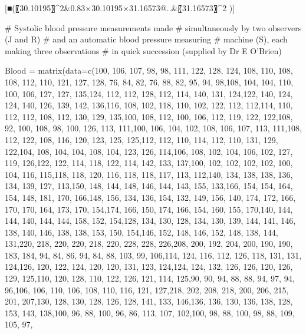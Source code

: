 [■(〖30.10195〗^2&0.83×30.10195×31.16573@..&〖31.16573〗^2 )]



# Systolic blood pressure measurements made 
# simultaneously by two observers (J and R) 
# and an automatic blood pressure measuring
# machine (S), each making three observations 
# in quick succession (supplied by Dr E O'Brien)

Blood = matrix(data=c(100, 106, 107, 98, 98, 111, 122, 128, 124, 108, 110, 108, 108, 112, 110, 121, 
127, 128, 76, 84, 82, 76, 88, 82, 95, 94, 98,108, 104, 104, 110, 100, 106, 127, 127, 135,124, 112, 112, 128, 112, 114, 140, 131, 124,122, 140, 124, 124, 140, 126, 139, 142, 136,116, 108, 102, 118, 110, 102, 122, 112, 112,114, 110, 112, 112, 108, 112, 130, 129, 135,100, 108, 112, 100, 106, 112, 119, 122, 122,108, 92, 100, 108, 98, 100, 126, 113, 111,100, 106, 104, 102, 108, 106, 107, 113, 111,108, 112, 122, 108, 116, 120, 123, 125, 125,112, 112, 110, 114, 112, 110, 131, 129, 122,104, 108, 104, 104, 108, 104, 123, 126, 114,106, 108, 102, 104, 106, 102, 127, 119, 126,122, 122, 114, 118, 122, 114, 142, 133, 137,100, 102, 102, 102, 102, 100, 104, 116, 115,118, 118, 120, 116, 118, 118, 117, 113, 112,140, 134, 138, 138, 136, 134, 139, 127, 113,150, 148, 144, 148, 146, 144, 143, 155, 133,166, 154, 154, 164, 154, 148, 181, 170, 166,148, 156, 134, 136, 154, 132, 149, 156, 140,
174, 172, 166, 170, 170, 164, 173, 170, 154,174, 166, 150, 174, 166, 154, 160, 155, 170,140, 144, 144, 140, 144, 144, 158, 152, 154,128, 134, 130, 128, 134, 130, 139, 144, 141,
146, 138, 140, 146, 138, 138, 153, 150, 154,146, 152, 148, 146, 152, 148, 138, 144, 131,220, 218, 220, 220, 218, 220, 228, 228, 226,208, 200, 192, 204, 200, 190, 190, 183, 184,
94, 84, 86, 94, 84, 88, 103, 99, 106,114, 124, 116, 112, 126, 118, 131, 131, 124,126, 120, 122, 124, 120, 120, 131, 123, 124,124, 124, 132, 126, 126, 120, 126, 129, 125,110, 120, 128, 110, 122, 126, 121, 114, 125,90, 90, 94, 88, 88, 94, 97, 94, 96,106, 106, 110, 106, 108, 110, 116, 121, 127,218, 202, 208, 218, 200, 206, 215, 201, 207,130, 128, 130, 128, 126, 128, 141, 133, 146,136, 136, 130, 136, 138, 128, 153, 143, 138,100, 96, 88, 100, 96, 86, 113, 107, 102,100, 98, 88, 100, 98, 88, 109, 105, 97,

